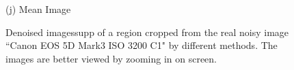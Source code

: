 \documentclass[10pt,onecolumn,letterpaper]{article}
\begin{document}
\begin{figure}[H]
{\begin{minipage}[t]{0.195\textwidth}
{\footnotesize (j) Mean Image \cite{crosschannel2016} }
\end{minipage}
}
\caption{Denoised imagessupp of a region cropped from the real noisy image ``Canon EOS 5D Mark3 ISO 3200 C1" \cite{crosschannel2016} by different methods. The images are better viewed by zooming in on screen.} 
\label{fig10}
\end{figure}

\begin{figure}[H]\vspace{1mm}
\centering
{}
\end{figure}
\end{document}
